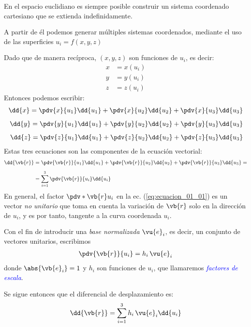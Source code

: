 En el espacio euclidiano es siempre posible construir un sistema coordenado cartesiano que se extienda indefinidamente.
\par
A partir de él podemos generar múltiples sistemas coordenados, mediante el uso de las superficies $u_{i} = f(x, y, z)$
\par
Dado que de manera recíproca, $(x, y, z)$ son funciones de $u_{i}$, es decir:
\begin{align*}
x &= x(u_{i}) \\
y &= y(u_{i}) \\
z &= z(u_{i})
\end{align*}
Entonces podemos escribir:
\begin{align*}
\dd{x} = \pdv{x}{u_{1}} \dd{u_{1}} + \pdv{x}{u_{2}} \dd{u_{2}} + \pdv{x}{u_{3}} \dd{u_{3}} \\[0.5em]
\dd{y} = \pdv{y}{u_{1}} \dd{u_{1}} + \pdv{y}{u_{2}} \dd{u_{2}} + \pdv{y}{u_{3}} \dd{u_{3}} \\[0.5em]
\dd{z} = \pdv{z}{u_{1}} \dd{u_{1}} + \pdv{z}{u_{2}} \dd{u_{2}} + \pdv{z}{u_{3}} \dd{u_{3}} \\
\end{align*}
Estas tres ecuaciones son las componentes de la ecuación vectorial:
\begin{align}
\begin{aligned}
\dd{\vb{r}} &= \pdv{\vb{r}}{u_{1}} \dd{u_{1}} + \pdv{\vb{r}}{u_{2}} \dd{u_{2}} + \pdv{\vb{r}}{u_{3}} \dd{u_{3}} = \\[0.5em]
&= \sum_{i=1}^{3} \pdv{\vb{r}}{u_{i}} \dd{u_{i}}
\end{aligned}
\label{eq:ecuacion_01_01}
\end{align}
En general, el factor $\pdv*{\vb{r}}{u_{i}}$ en la ec. (\ref{eq:ecuacion_01_01}) es un vector \emph{no unitario} que toma en cuenta la variación de $\vb{r}$ solo en la dirección de $u_{i}$, y es por tanto, tangente a la curva coordenada $u_{i}$.
\par
Con el fin de introducir una \emph{base normalizada} $\vu{e}_{i}$, es decir, un conjunto de vectores unitarios, escribimos
\begin{align}
\pdv{\vb{r}}{u_{i}} = h_{i} \, \vu{e}_{i}
\label{eq:ecuacion_01_02}
\end{align}
donde $\abs{\vb{e}_{i}} = 1$ y $h_{i}$ son funciones de $u_{i}$, que llamaremos \emph{\textcolor{blue}{factores de escala}}.
\par
Se sigue entonces que el diferencial de desplazamiento es:
\begin{align*}
\dd{\vb{r}} = \sum_{i=1}^{3} h_{i} \, \vu{e}_{i} \dd{u_{i}}
\end{align*}
